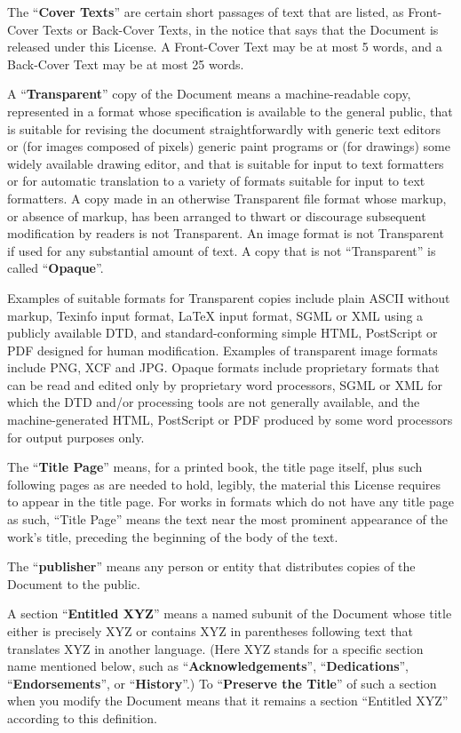 The ``\textbf{Cover Texts}'' are certain short passages of text that are listed,
as Front-Cover Texts or Back-Cover Texts, in the notice that says that
the Document is released under this License.  A Front-Cover Text may
be at most 5 words, and a Back-Cover Text may be at most 25 words.

A ``\textbf{Transparent}'' copy of the Document means a machine-readable copy,
represented in a format whose specification is available to the
general public, that is suitable for revising the document
straightforwardly with generic text editors or (for images composed of
pixels) generic paint programs or (for drawings) some widely available
drawing editor, and that is suitable for input to text formatters or
for automatic translation to a variety of formats suitable for input
to text formatters.  A copy made in an otherwise Transparent file
format whose markup, or absence of markup, has been arranged to thwart
or discourage subsequent modification by readers is not Transparent.
An image format is not Transparent if used for any substantial amount
of text.  A copy that is not ``Transparent'' is called ``\textbf{Opaque}''.

Examples of suitable formats for Transparent copies include plain
ASCII without markup, Texinfo input format, LaTeX input format, SGML
or XML using a publicly available DTD, and standard-conforming simple
HTML, PostScript or PDF designed for human modification.  Examples of
transparent image formats include PNG, XCF and JPG.  Opaque formats
include proprietary formats that can be read and edited only by
proprietary word processors, SGML or XML for which the DTD and/or
processing tools are not generally available, and the
machine-generated HTML, PostScript or PDF produced by some word
processors for output purposes only.

The ``\textbf{Title Page}'' means, for a printed book, the title page itself,
plus such following pages as are needed to hold, legibly, the material
this License requires to appear in the title page.  For works in
formats which do not have any title page as such, ``Title Page'' means
the text near the most prominent appearance of the work's title,
preceding the beginning of the body of the text.

The ``\textbf{publisher}'' means any person or entity that distributes
copies of the Document to the public.

A section ``\textbf{Entitled XYZ}'' means a named subunit of the Document whose
title either is precisely XYZ or contains XYZ in parentheses following
text that translates XYZ in another language.  (Here XYZ stands for a
specific section name mentioned below, such as ``\textbf{Acknowledgements}'',
``\textbf{Dedications}'', ``\textbf{Endorsements}'', or ``\textbf{History}''.)  
To ``\textbf{Preserve the Title}''
of such a section when you modify the Document means that it remains a
section ``Entitled XYZ'' according to this definition.

